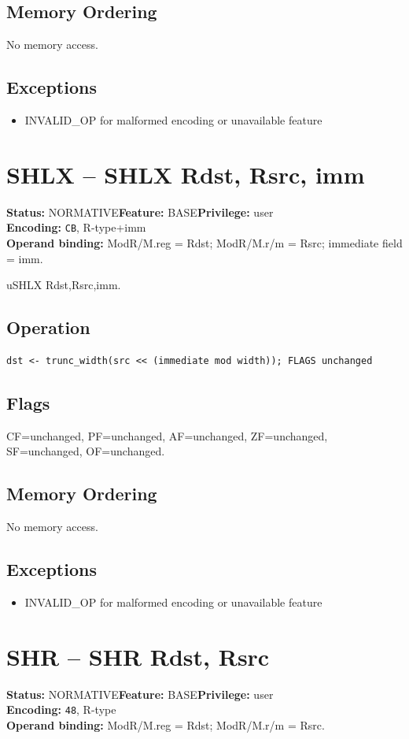 \documentclass[10pt]{article}
\begin{document}
\subsection*{Memory Ordering}
No memory access.
\subsection*{Exceptions}
\begin{itemize}
\item INVALID\_OP for malformed encoding or unavailable feature
\end{itemize}
\clearpage

\section{SHLX -- SHLX Rdst, Rsrc, imm}
\textbf{Status:} NORMATIVE\quad \textbf{Feature:} BASE\quad \textbf{Privilege:} user\\
\textbf{Encoding:} \texttt{CB}, R-type+imm\\
\textbf{Operand binding:} ModR/M.reg = Rdst; ModR/M.r/m = Rsrc; immediate field = imm.

uSHLX Rdst,Rsrc,imm.

\subsection*{Operation}
\begin{lstlisting}
dst <- trunc_width(src << (immediate mod width)); FLAGS unchanged
\end{lstlisting}
\subsection*{Flags}
CF=unchanged, PF=unchanged, AF=unchanged, ZF=unchanged, SF=unchanged, OF=unchanged.
\subsection*{Memory Ordering}
No memory access.
\subsection*{Exceptions}
\begin{itemize}
\item INVALID\_OP for malformed encoding or unavailable feature
\end{itemize}
\clearpage

\section{SHR -- SHR Rdst, Rsrc}
\textbf{Status:} NORMATIVE\quad \textbf{Feature:} BASE\quad \textbf{Privilege:} user\\
\textbf{Encoding:} \texttt{48}, R-type\\
\textbf{Operand binding:} ModR/M.reg = Rdst; ModR/M.r/m = Rsrc.
\end{document}
